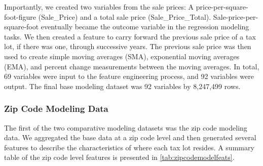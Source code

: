 \documentclass[12pt,]{article}
\begin{document}
Importantly, we created two variables from the sale prices: A
price-per-square-foot-figure (Sale\_Price) and a total sale price
(Sale\_Price\_Total). Sale-price-per-square-foot eventually became the
outcome variable in the regression modeling tasks. We then created a
feature to carry forward the previous sale price of a tax lot, if there
was one, through successive years. The previous sale price was then used
to create simple moving averages (SMA), exponential moving averages
(EMA), and percent change measurements between the moving averages. In
total, 69 variables were input to the feature engineering process, and
92 variables were output. The final base modeling dataset was 92
variables by 8,247,499 rows.

\hypertarget{zip-code-modeling-data}{%
\subsubsection{Zip Code Modeling Data}\label{zip-code-modeling-data}}

The first of the two comparative modeling datasets was the zip code
modeling data. We aggregated the base data at a zip code level and then
generated several features to describe the characteristics of where each
tax lot resides. A summary table of the zip code level features is
presented in \ref{tab:zipcodemodelfeats}.
\end{document}
